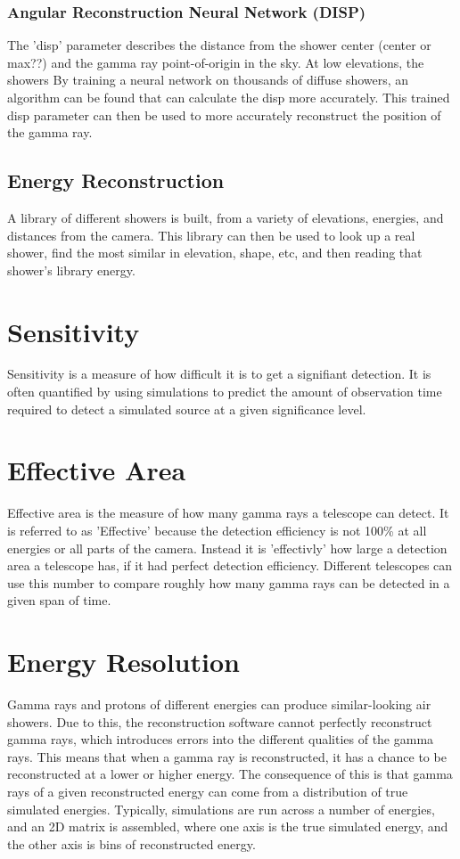 \subsubsection{Angular Reconstruction Neural Network (DISP)}
The 'disp' parameter describes the distance from the shower center (center or max??) and the gamma ray point-of-origin in the sky.
At low elevations, the showers
By training a neural network on thousands of diffuse showers, an algorithm can be found that can calculate the disp more accurately.
This trained disp parameter can then be used to more accurately reconstruct the position of the gamma ray.

\subsection{Energy Reconstruction}\label{subsec:enrecon}
A library of different showers is built, from a variety of elevations, energies, and distances from the camera.
This library can then be used to look up a real shower, find the most similar in elevation, shape, etc, and then reading that shower's library energy.


\section{Sensitivity}
Sensitivity is a measure of how difficult it is to get a signifiant detection.
It is often quantified by using simulations to predict the amount of observation time required to detect a simulated source at a given significance level.


\section{Effective Area}
Effective area is the measure of how many gamma rays a telescope can detect.
It is referred to as 'Effective' because the detection efficiency is not 100\% at all energies or all parts of the camera.
Instead it is 'effectivly' how large a detection area a telescope has, if it had perfect detection efficiency.
Different telescopes can use this number to compare roughly how many gamma rays can be detected in a given span of time.


\section{Energy Resolution}
Gamma rays and protons of different energies can produce similar-looking air showers.
Due to this, the reconstruction software cannot perfectly reconstruct gamma rays, which introduces errors into the different qualities of the gamma rays.
This means that when a gamma ray is reconstructed, it has a chance to be reconstructed at a lower or higher energy.
The consequence of this is that gamma rays of a given reconstructed energy can come from a distribution of true simulated energies.
Typically, simulations are run across a number of energies, and an 2D matrix is assembled, where one axis is the true simulated energy, and the other axis is bins of reconstructed energy.


